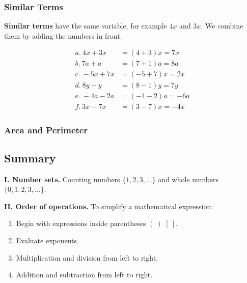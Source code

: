 \documentclass[letter]{article}
\newenvironment{keybox}
  {\begin{lrbox}{\keyboxsave}\begin{minipage}{\dimexpr\linewidth-2\fboxsep-2\fboxrule\relax}}
  {\end{minipage}\end{lrbox}\par\noindent\fbox{\usebox{\keyboxsave}}\par}
\begin{document}
\subsubsection*{Similar Terms}

\begin{keybox}
\textbf{Similar terms} have the same variable, for example $4x$ and $3x$. We combine them by adding the numbers in front.
\end{keybox}
\begin{align*}
  a.\ 4x+3x&=(4+3)x=7x\\
  b.\ 7a+a&=(7+1)a=8a\\
  c.\ -5x+7x&=(-5+7)x=2x\\
  d.\ 8y-y&=(8-1)y=7y\\
  e.\ -4a-2a&=(-4-2)a=-6a\\
  f.\ 3x-7x&=(3-7)x=-4x
\end{align*}

\subsubsection*{Area and Perimeter}

\begin{center}
\end{center}

\subsection{Summary}

\textbf{I. Number sets.} Counting numbers $\{1,2,3,\ldots\}$ and whole numbers $\{0,1,2,3,\ldots\}$.

\textbf{II. Order of operations.} To simplify a mathematical expression:
\begin{enumerate}[itemsep=0pt]
  \item Begin with expressions inside parentheses $(\ )$ $[\ ]$.
  \item Evaluate exponents.
  \item Multiplication and division from left to right.
  \item Addition and subtraction from left to right.
\end{enumerate}
\end{document}
